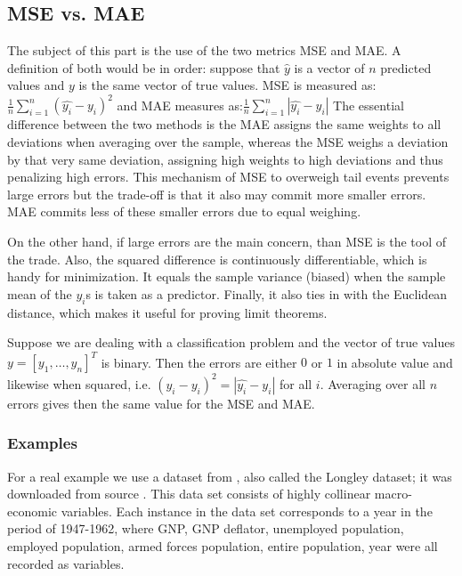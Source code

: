 \documentclass{llncs}
\begin{document}
\subsection{MSE vs. MAE}
The subject of this part is the use of the two metrics MSE and MAE. A definition of both would be in order: suppose that $\hat{y}$ is a vector of $n$ predicted values and $y$ is the same vector of true values. MSE is measured as: $\frac{1}{n}\sum_{i=1}^{n}(\hat{y_{i}} - y_{i})^{2}$  
and MAE measures as:$\frac{1}{n}\sum_{i=1}^{n}|\hat{y_{i}}-y_{i}|$
The essential difference between the two methods is the MAE assigns the same weights to all deviations when averaging over the sample, whereas the MSE weighs a deviation by that very same deviation, assigning high weights to high deviations and thus penalizing high errors. This mechanism of MSE to overweigh tail events prevents large errors but the trade-off is that it also may commit more smaller errors. MAE commits less of these smaller errors due to equal weighing.

On the other hand, if large errors are the main concern, than MSE is the tool of the trade. Also, the squared difference is continuously differentiable, which is handy for minimization. It equals the sample variance (biased) when the sample mean of the $y_{i}$s is taken as a predictor. Finally, it also ties in with the Euclidean distance, which makes it useful for proving limit theorems.

Suppose we are dealing with a classification problem and the vector of true values $y=[y_{1},\dots,y_{n}]^{T}$ is binary. Then the errors are either $0$ or $1$ in absolute value and likewise when squared, i.e. $(\hat{y_{i}} - y_{i})^{2}=|\hat{y_{i}}-y_{i}|$ for all $i$. Averaging over all $n$ errors gives then the same value for the MSE and MAE.

\subsubsection{Examples}
For a real example we use a dataset from \cite{Longl}, also called the Longley dataset; it was downloaded from source \cite{WinNT}. This data set consists of highly collinear macro-economic variables. Each instance in the data set corresponds to a year in the period of 1947-1962, where GNP, GNP deflator, unemployed population, employed population, armed forces population, entire population, year were all recorded as variables.
\end{document}
